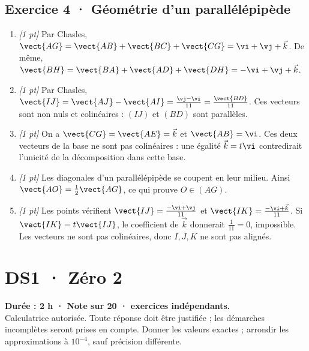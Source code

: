 \subsection*{Exercice 4 · Géométrie d'un parallélépipède}\begin{enumerate}

\item \textit{[1 pt]} Par Chasles, $\vect{AG}=\vect{AB}+\vect{BC}+\vect{CG}=\vi +\vj +\vec k$. De même, $\vect{BH}=\vect{BA}+\vect{AD}+\vect{DH}=-\vi +\vj +\vec k$.

\item \textit{[1 pt]} Par Chasles, $\vect{IJ}=\vect{AJ}-\vect{AI}=\frac{\vj -\vi }{11}=\frac{\vect{BD}}{11}$. Ces vecteurs sont non nuls et colinéaires : $(IJ)$ et $(BD)$ sont parallèles.

\item \textit{[1 pt]} On a $\vect{CG}=\vect{AE}=\vec k$ et $\vect{AB}=\vi $. Ces deux vecteurs de la base ne sont pas colinéaires : une égalité $\vec k=t\vi $ contredirait l'unicité de la décomposition dans cette base.

\item \textit{[1 pt]} Les diagonales d'un parallélépipède se coupent en leur milieu. Ainsi $\vect{AO}=\frac12\vect{AG}$, ce qui prouve $O\in(AG)$.

\item \textit{[1 pt]} Les points vérifient $\vect{IJ}=\frac{-\vi +\vj }{11}$ et $\vect{IK}=\frac{-\vi +\vec k}{11}$. Si $\vect{IK}=t\vect{IJ}$, le coefficient de $\vec k$ donnerait $\frac{1}{11}=0$, impossible. Les vecteurs ne sont pas colinéaires, donc $I,J,K$ ne sont pas alignés.

\end{enumerate}

\fi

\mxnewpage{}\label{sujet:1-2}

\section*{DS1 · Zéro 2}


\textbf{Durée : 2 h · Note sur 20 ·  exercices indépendants.}\\Calculatrice autorisée. Toute réponse doit être justifiée ; les démarches incomplètes seront prises en compte. Donner les valeurs exactes ; arrondir les approximations à $10^{-4}$, sauf précision différente.

